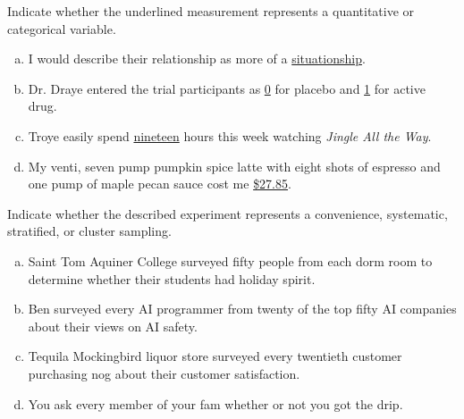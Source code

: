 \documentclass[12pt,letterpaper]{exam}
\begin{document}
\examtitle
{} 
\scores
\bottomline
\newpage

\begin{questions}

\newpage
\question[10] Indicate whether the underlined measurement represents a quantitative or categorical variable.
	\begin{enumerate}[(a)]
	\item I would describe their relationship as more of a \underline{situationship}. 
	\item Dr. Draye entered the trial participants as \underline{0} for placebo and \underline{1} for active drug. 
	\item Troye easily spend \underline{nineteen} hours this week watching \textit{Jingle All the Way}. 
	\item My venti, seven pump pumpkin spice latte with eight shots of espresso and one pump of maple pecan sauce cost me \underline{\$27.85}. 
	\end{enumerate}



\newpage
\question[10] Indicate whether the described experiment represents a convenience, systematic, stratified, or cluster sampling. 
	\begin{enumerate}[(a)]
	\item Saint Tom Aquiner College surveyed fifty people from each dorm room to determine whether their students had holiday spirit. 
	\item Ben surveyed every AI programmer from twenty of the top fifty AI companies about their views on AI safety. 
	\item Tequila Mockingbird liquor store surveyed every twentieth customer purchasing nog about their customer satisfaction.  
	\item You ask every member of your fam whether or not you got the drip. 
	\end{enumerate}




\end{questions}
\end{document}
